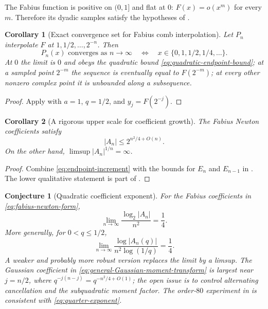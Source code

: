 \documentclass[11pt,a4paper,oneside]{article}
\newtheorem{corollary}[corollary]{Corollary}
\newtheorem{conjecture}[conjecture]{Conjecture}
\theoremstyle{definition}
\theoremstyle{remark}
\begin{document}
The Fabius function is positive on $(0,1]$ and flat at $0$:
$F(x)=o(x^m)$ for every $m$.  Therefore its dyadic samples satisfy the
hypotheses of .

\begin{corollary}[Exact convergence set for Fabius comb interpolation]
\label{cor:fabius-convergence-set}
Let $P_n$ interpolate $F$ at $1,1/2,\ldots,2^{-n}$.  Then
\begin{equation}
 P_n(x)\text{ converges as }n\to\infty
 \quad\Longleftrightarrow\quad
 x\in\{0,1,1/2,1/4,\ldots\}.
 \label{eq:fabius-convergence-set}
\end{equation}
At $0$ the limit is $0$ and obeys the quadratic bound
\eqref{eq:quadratic-endpoint-bound}; at a sampled point $2^{-m}$ the sequence
is eventually equal to $F(2^{-m})$; at every other nonzero complex point it is
unbounded along a subsequence.
\end{corollary}

\begin{proof}
Apply  with $a=1$, $q=1/2$, and
$y_j=F(2^{-j})$.
\end{proof}

\begin{corollary}[A rigorous upper scale for coefficient growth]
\label{cor:coefficient-upper}
The Fabius Newton coefficients satisfy
\begin{equation}
 |A_n|\le2^{n^2/4+O(n)}.
 \label{eq:coefficient-upper}
\end{equation}
On the other hand, $\limsup|A_n|^{1/n}=\infty$.
\end{corollary}

\begin{proof}
Combine \eqref{eq:endpoint-increment} with the bounds for $E_n$ and $E_{n-1}$
in .  The lower qualitative statement is
part of .
\end{proof}

\begin{conjecture}[Quadratic coefficient exponent]
\label{conj:quarter-exponent}
For the Fabius coefficients in \eqref{eq:fabius-newton-form},
\begin{equation}
 \lim_{n\to\infty}\frac{\log_2|A_n|}{n^2}=\frac14.
 \label{eq:quarter-exponent}
\end{equation}
More generally, for $0<q\le1/2$,
\begin{equation}
 \lim_{n\to\infty}
 \frac{\log|A_n(q)|}{n^2\log(1/q)}=\frac14.
 \label{eq:quarter-exponent-general}
\end{equation}
A weaker and probably more robust version replaces the limit by a limsup.  The
Gaussian coefficient in \eqref{eq:general-Gaussian-moment-transform} is largest
near $j=n/2$, where $q^{-j(n-j)}=q^{-n^2/4+O(1)}$; the open issue is to control
alternating cancellation and the subquadratic moment factor.  The order-$80$
experiment in  is consistent with
\eqref{eq:quarter-exponent}.
\end{conjecture}
\end{document}
